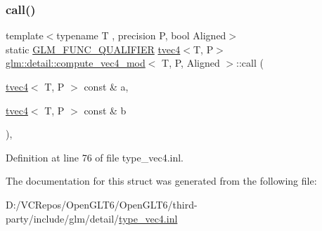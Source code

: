 \subsubsection{\texorpdfstring{call()}{call()}}
{\footnotesize\ttfamily template$<$typename T , precision P, bool Aligned$>$ \\
static \mbox{\hyperlink{setup_8hpp_a33fdea6f91c5f834105f7415e2a64407}{G\+L\+M\+\_\+\+F\+U\+N\+C\+\_\+\+Q\+U\+A\+L\+I\+F\+I\+ER}} \mbox{\hyperlink{structglm_1_1tvec4}{tvec4}}$<$T, P$>$ \mbox{\hyperlink{structglm_1_1detail_1_1compute__vec4__mod}{glm\+::detail\+::compute\+\_\+vec4\+\_\+mod}}$<$ T, P, Aligned $>$\+::call (\begin{DoxyParamCaption}\item[{\mbox{\hyperlink{structglm_1_1tvec4}{tvec4}}$<$ T, P $>$ const \&}]{a,  }\item[{\mbox{\hyperlink{structglm_1_1tvec4}{tvec4}}$<$ T, P $>$ const \&}]{b }\end{DoxyParamCaption})\hspace{0.3cm}{\ttfamily [inline]}, {\ttfamily [static]}}



Definition at line 76 of file type\+\_\+vec4.\+inl.



The documentation for this struct was generated from the following file\+:\begin{DoxyCompactItemize}
\item 
D\+:/\+V\+C\+Repos/\+Open\+G\+L\+T6/\+Open\+G\+L\+T6/third-\/party/include/glm/detail/\mbox{\hyperlink{type__vec4_8inl}{type\+\_\+vec4.\+inl}}\end{DoxyCompactItemize}
